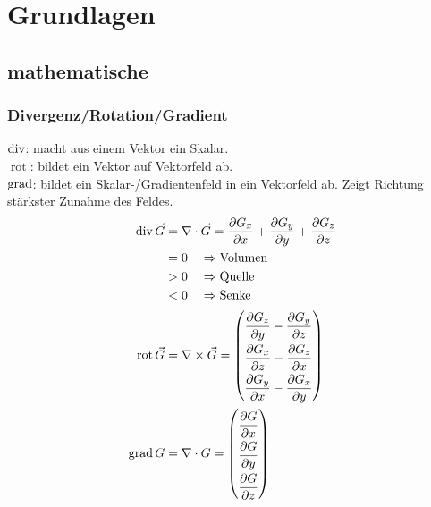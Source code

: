 \section{Grundlagen}
\subsection{mathematische}
\subsubsection*{Divergenz/Rotation/Gradient}

$\operatorname{div}$: macht aus einem Vektor ein Skalar.\\
$\operatorname{rot}$: bildet ein Vektor auf Vektorfeld ab.\\
$\operatorname{grad}$: bildet ein Skalar-/Gradientenfeld in ein Vektorfeld ab.
Zeigt Richtung stärkster Zunahme des Feldes.
\begin{align*}
    \opdiv \vec{G}             & = \nabla \cdot \vec{G} = \dfrac{\partial G_x}{\partial x} + \dfrac{\partial G_y}{\partial y} + \dfrac{\partial G_z}{\partial z} \\
                               & = 0 \quad\Rightarrow \textnormal{Volumen}                                                                                       \\
                               & > 0 \quad\Rightarrow \textnormal{Quelle}                                                                                        \\
                               & < 0 \quad\Rightarrow \textnormal{Senke}                                                                                         \\
    \arraycolsep=1.0pt\def\arraystretch{2.0}
    \operatorname{rot} \vec{G} & = \nabla \times \vec{G} =
    \begin{pmatrix}
        \dfrac{\partial G_z}{\partial y} - \dfrac{\partial G_y}{\partial z} \\
        \dfrac{\partial G_x}{\partial z} - \dfrac{\partial G_z}{\partial x} \\
        \dfrac{\partial G_y}{\partial x} - \dfrac{\partial G_x}{\partial y} \\
    \end{pmatrix}                                                                                          \\
    \arraycolsep=1.0pt\def\arraystretch{2.0}
    \opgrad G                  & = \nabla \cdot G =
    \begin{pmatrix}
        \dfrac{\partial G}{\partial x} \\
        \dfrac{\partial G}{\partial y} \\
        \dfrac{\partial G}{\partial z} \\
    \end{pmatrix}
\end{align*}

